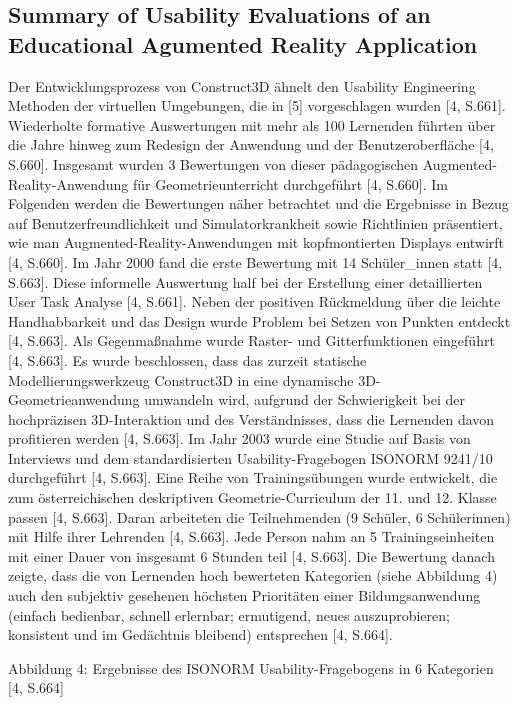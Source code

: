\documentclass[deutsch]{llncs}
\begin{document}
\subsection{Summary of Usability Evaluations of an Educational Agumented Reality Application}

Der Entwicklungsprozess von Construct3D ähnelt den Usability Engineering Methoden der virtuellen Umgebungen, die in [5] vorgeschlagen wurden [4, S.661]. Wiederholte formative Auswertungen mit mehr als 100 Lernenden führten über die Jahre hinweg zum Redesign der Anwendung und der Benutzeroberfläche [4, S.660]. Insgesamt wurden 3 Bewertungen von dieser pädagogischen Augmented-Reality-Anwendung für Geometrieunterricht durchgeführt [4, S.660]. Im Folgenden werden die Bewertungen näher betrachtet und die Ergebnisse in Bezug auf Benutzerfreundlichkeit und Simulatorkrankheit sowie Richtlinien präsentiert, wie man Augmented-Reality-Anwendungen mit kopfmontierten Displays entwirft [4, S.660].
Im Jahr 2000 fand die erste Bewertung mit 14 Schüler\_innen statt [4, S.663]. Diese informelle Auswertung half bei der Erstellung einer detaillierten User Task Analyse [4, S.661]. Neben der positiven Rückmeldung über die leichte Handhabbarkeit und das Design wurde Problem bei Setzen von Punkten entdeckt [4, S.663]. Als Gegenmaßnahme wurde Raster- und Gitterfunktionen eingeführt [4, S.663]. Es wurde beschlossen, dass das zurzeit statische Modellierungswerkzeug Construct3D in eine dynamische 3D-Geometrieanwendung umwandeln wird, aufgrund der Schwierigkeit bei der hochpräzisen 3D-Interaktion und des Verständnisses, dass die Lernenden davon profitieren werden [4, S.663]. 
Im Jahr 2003 wurde eine Studie auf Basis von Interviews und dem standardisierten Usability-Fragebogen ISONORM 9241/10 durchgeführt [4, S.663]. Eine Reihe von Trainingsübungen wurde entwickelt, die zum österreichischen deskriptiven Geometrie-Curriculum der 11. und 12. Klasse passen [4, S.663].  Daran arbeiteten die Teilnehmenden (9 Schüler, 6 Schülerinnen) mit Hilfe ihrer Lehrenden [4, S.663]. Jede Person nahm an 5 Trainingseinheiten mit einer Dauer von insgesamt 6 Stunden teil [4, S.663]. Die Bewertung danach zeigte, dass die von Lernenden hoch bewerteten Kategorien (siehe Abbildung 4) auch den subjektiv gesehenen höchsten Prioritäten einer Bildungsanwendung (einfach bedienbar, schnell erlernbar; ermutigend, neues auszuprobieren; konsistent und im Gedächtnis bleibend) entsprechen [4, S.664].

Abbildung 4: Ergebnisse des ISONORM Usability-Fragebogens in 6 Kategorien [4, S.664]
\end{document}
